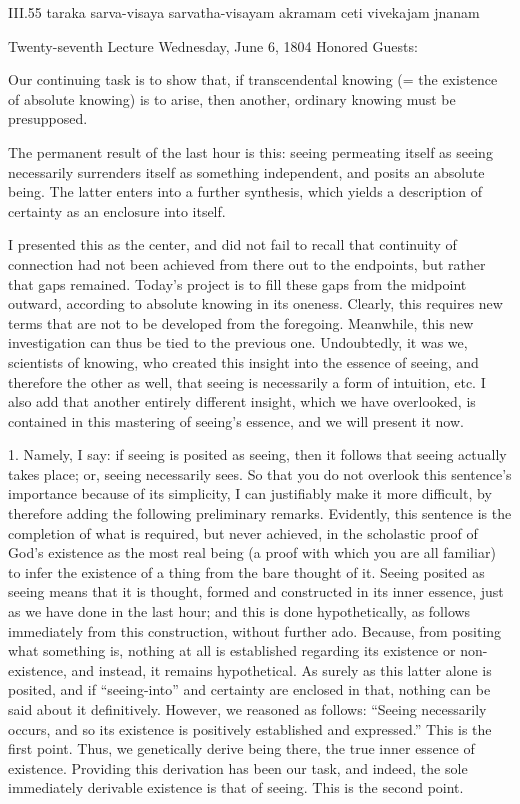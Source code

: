 III.55
taraka sarva-visaya sarvatha-visayam akramam ceti vivekajam jnanam

Twenty-seventh Lecture
Wednesday, June 6, 1804
Honored Guests:

Our continuing task is to show that,
if transcendental knowing
(= the existence of absolute knowing)
is to arise, then another,
ordinary knowing must be presupposed.

The permanent result of the last hour is this:
seeing permeating itself as seeing
necessarily surrenders itself
as something independent,
and posits an absolute being.
The latter enters into a further synthesis,
which yields a description of certainty
as an enclosure into itself.

I presented this as the center,
and did not fail to recall
that continuity of connection
had not been achieved
from there out to the endpoints,
but rather that gaps remained.
Today's project is to fill these gaps
from the midpoint outward,
according to absolute knowing
in its oneness.
Clearly, this requires new terms
that are not to be developed from the foregoing.
Meanwhile, this new investigation can
thus be tied to the previous one.
Undoubtedly, it was we, scientists of knowing,
who created this insight into the essence of seeing,
and therefore the other as well,
that seeing is necessarily a form of intuition, etc.
I also add that another entirely different insight,
which we have overlooked, is contained in
this mastering of seeing's essence,
and we will present it now.

1. Namely, I say:
if seeing is posited as seeing,
then it follows that seeing actually takes place;
or, seeing necessarily sees.
So that you do not overlook this sentence's importance
because of its simplicity,
I can justifiably make it more difficult,
by therefore adding the following preliminary remarks.
Evidently, this sentence is the completion
of what is required, but never achieved,
in the scholastic proof of God's existence
as the most real being
(a proof with which you are all familiar)
to infer the existence of a thing
from the bare thought of it.
Seeing posited as seeing means that
it is thought, formed and constructed
in its inner essence,
just as we have done in the last hour;
and this is done hypothetically,
as follows immediately from this construction,
without further ado.
Because, from positing what something is,
nothing at all is established regarding
its existence or non-existence,
and instead, it remains hypothetical.
As surely as this latter alone is posited,
and if “seeing-into” and certainty are enclosed in that,
nothing can be said about it definitively.
However, we reasoned as follows:
“Seeing necessarily occurs,
and so its existence is
positively established and expressed.”
This is the first point.
Thus, we genetically derive being there,
the true inner essence of existence.
Providing this derivation has been our task,
and indeed, the sole immediately derivable
existence is that of seeing.
This is the second point.

